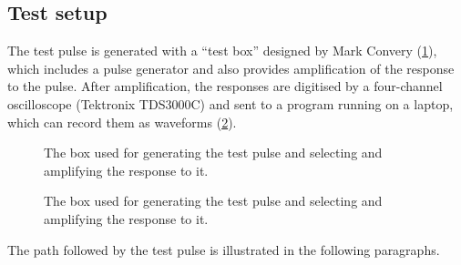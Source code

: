 \subsection{Test setup}
\label{ssec:methodology:setup}

The test pulse is generated with a ``test box'' designed by Mark Convery
(\cref{fig:TestBox}), which includes a pulse generator and also provides
amplification of the response to the pulse.
After amplification, the responses are digitised by a four-channel oscilloscope
(Tektronix TDS3000C) and sent to a program running on a laptop, which can record
them as waveforms (\cref{fig:TestSetup}).
\begin{figure}
  \caption{\label{fig:TestBox}
    The box used for generating the test pulse and selecting and amplifying the
    response to it.
  }
\end{figure}
\begin{figure}
  \caption{\label{fig:TestSetup}
    The box used for generating the test pulse and selecting and amplifying the
    response to it.
  }
\end{figure}

The path followed by the test pulse is illustrated in the following paragraphs.

